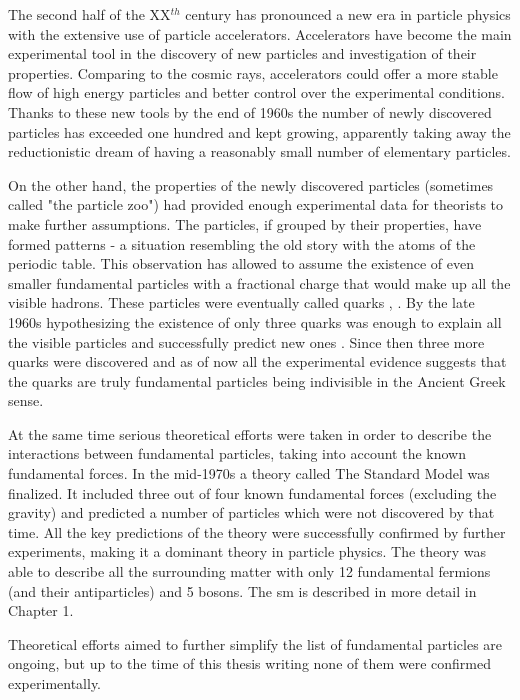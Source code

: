 The second half of the XX$^{th}$ century has pronounced a new era in particle physics with the extensive use of particle accelerators. Accelerators have become the main experimental tool in the discovery of new particles and investigation of their properties. Comparing to the cosmic rays, accelerators could offer a more stable flow of high energy particles and better control over the experimental conditions. Thanks to these new tools by the end of 1960s the number of newly discovered particles has exceeded one hundred and kept growing, apparently taking away the reductionistic dream of having a reasonably small number of elementary particles. 

On the other hand, the properties of the newly discovered particles (sometimes called "the particle zoo") had provided enough experimental data for theorists to make further assumptions. The particles, if grouped by their properties, have formed patterns - a situation resembling the old story with the atoms of the periodic table. This observation has allowed to assume the existence of even smaller fundamental particles with a fractional charge that would make up all the visible hadrons. These particles were eventually called quarks \cite{gellMann}, \cite{zweig}. By the late 1960s hypothesizing the existence of only three quarks was enough to explain all the visible particles and successfully predict new ones \cite{omega}. Since then three more quarks were discovered and as of now all the experimental evidence suggests that the quarks are truly fundamental particles being indivisible in the Ancient Greek sense. 

At the same time serious theoretical efforts were taken in order to describe the interactions between fundamental particles, taking into account the known fundamental forces. In the mid-1970s a theory called The Standard Model was finalized. It included three out of four known fundamental forces (excluding the gravity) and predicted a number of particles which were not discovered by that time. All the key predictions of the theory were successfully confirmed by further experiments, making it a dominant theory in particle physics. The theory was able to describe all the surrounding matter with only 12 fundamental fermions (and their antiparticles) and 5 bosons. The \gls{sm} is described in more detail in Chapter 1.

Theoretical efforts aimed to further simplify the list of fundamental particles are ongoing, but up to the time of this thesis writing none of them were confirmed experimentally. 

